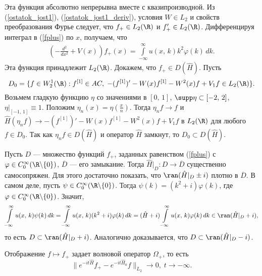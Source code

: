 \documentclass[a4paper
]{article}
\begin{document}
Эта функция абсолютно непрерывна вместе с квазипроизводной.
Из (\ref{ostatok_jost1}), (\ref{ostatok_jost1_deriv}), условия $W\in L_2$
и свойств преобразования Фурье следует, что $f_+\in L_2(\R)$ и $f'_+
\in L_2(\R)$. Дифференцируя интеграл в (\ref{fplus}) по $x$,
получаем, что
\begin{align}
\label{hf_plus}
\left(-\frac{d^2}{dx^2}+V(x)\right)f_+(x)=\int \limits_{-\infty}
^\infty u(x, \, k)k^2\varphi(k)\, dk.
\end{align}
Эта функция принадлежит $L_2(\R)$. Докажем, что $f_+\in D(\hat H)$.
Пусть $$D_0=\{f\in W^1_2(\R):f^{[1]}\in AC, \; -(f^{[1]})'-W(x)f^{[1]}
-W^2(x)f+V_1f\in L_2(\R)\}.$$
Возьмем гладкую функцию $\eta$ со значениями в $[0, \, 1]$, $\supp \eta
\subset [-2, \, 2]$, $\eta|_{[-1, \, 1]}\equiv 1$. Положим $\eta _n(x)=
\eta\left(\frac{x}{n}\right)$. Тогда $\eta_n f\rightarrow f$ и $\hat H
(\eta_n f)\rightarrow -(f^{[1]})'-W(x)f^{[1]}-W^2(x)f+V_1f$ в $L_2(\R)$
для любого $f\in D_0$. Так как $\eta_nf\in D(\hat H)$ и оператор $\hat H$
замкнут, то $D_0\subset D(\hat H)$. \par
Пусть $D$ --- множество функций $f_+$, заданных равенством (\ref{fplus})
с $\varphi\in C_0^\infty(\R\backslash \{0\})$, $\overline D$ --- его замыкание.
Тогда $\hat H|_D:D\rightarrow \overline D$ существенно самосопряжен. Для этого
достаточно показать, что $\ran (\hat H|_D\pm i)$ плотно в $\overline D$.
В самом деле, пусть $\psi\in C_0^\infty (\R\backslash \{0\})$. Тогда
$\psi(k)=(k^2+i)\varphi(k)$, где $\varphi \in C_0^\infty(\R\backslash \{0\})$.
Значит, $$\int \limits _{-\infty}^\infty u(x, \, k)\psi(k)\, dk=\int \limits
_{-\infty}^\infty u(x, \, k)(k^2+i)\varphi(k)\, dk=(\hat H+i)\int \limits
_{-\infty}^{\infty}u(x, \, k)\varphi(k)\, dk\in \ran (\hat H|_D+i),$$
то есть $D\subset \ran (\hat H|_D+i)$. Аналогично доказывается, что
$D\subset \ran (\hat H|_D-i)$.
\begin{Sta}
Отображение $f\mapsto f_+$ задает волновой оператор $\Omega_+$, то есть
$$\|e^{-it\hat H}f_+-e^{-it\hat H_0}f\|_{L_2}\rightarrow 0, \; t\rightarrow
-\infty.$$
\end{Sta}
\end{document}
